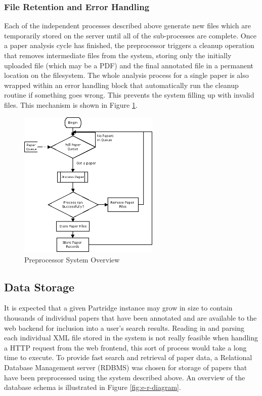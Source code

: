 \subsubsection{File Retention and Error Handling}

Each of the independent processes described above generate new files which are
temporarily stored on the server until all of the sub-processes are complete.
Once a paper analysis cycle has finished, the preprocessor triggers a cleanup
operation that removes intermediate files from the system, storing only the
initially uploaded file (which may be a PDF) and the final annotated file in a
permanent location on the filesystem.  The whole analysis process for a single
paper is also wrapped within an error handling block that automatically run the
cleanup routine if something goes wrong. This prevents the system filling up
with invalid files. This mechanism is shown in Figure
\ref{fig:preprocessor_overview}.

\begin{figure}[!h]
\vspace{5mm}
\centering
\includegraphics[width=0.6\textwidth]{images/design/paper_processor_overview.png}
\caption{Preprocessor System Overview}
\label{fig:preprocessor_overview}
\end{figure}


\subsection{ Data Storage }
\label{sec:db_layout}
It is expected that a given Partridge instance may grow in size to contain
thousands of individual papers that have been annotated and are available to
the web backend for inclusion into a user's search results. Reading in and
parsing each individual XML file stored in the system is not really feasible
when handling a HTTP request from the web frontend, this sort of process would
take a long time to execute. To provide fast search and retrieval of paper
data, a Relational Database Management server (RDBMS) was chosen for storage of
papers that have been preprocessed using the system described above. An
overview of the database schema is illustrated in Figure \ref{fig:e-r-diagram}.


